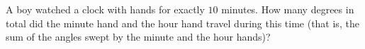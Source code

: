 A boy watched a clock with hands for exactly $10$ minutes. How many degrees in total did the minute hand and the hour hand travel during this time (that is, the sum of the angles swept by the minute and the hour hands)?
